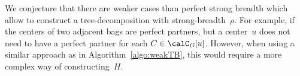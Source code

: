 We conjecture that there are weaker cases than perfect strong breadth which allow to construct a tree-decomposition with strong-breadth~$\rho$.
For example, if the centers of two adjacent bags are perfect partners, but a center~$u$ does not need to have a perfect partner for each $C \in \calC_G[u]$.
However, when using a similar approach as in Algorithm~\ref{algo:weakTB}, this would require a more complex way of constructing~$H$.


